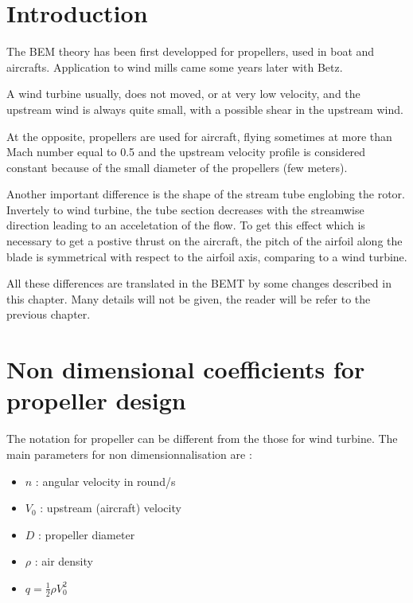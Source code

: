 \section{Introduction}

The BEM theory has been first developped for propellers, used in boat and
aircrafts. Application to wind mills came some years later with Betz.

A wind turbine usually, does not moved, or at very low velocity, and the upstream wind is always
quite small, with a possible shear in the upstream wind.

At the opposite, propellers are used for aircraft, flying sometimes at more than Mach number equal to 0.5
and the upstream velocity profile is considered constant because of the small diameter of the propellers (few meters).

Another important difference is the shape of the stream tube englobing the rotor. Invertely to wind turbine, the 
tube section decreases with the streamwise direction leading to an acceletation of the flow.
To get this effect which is necessary to get a postive thrust on the aircraft, the pitch of the airfoil along
the blade is symmetrical with respect to the airfoil axis, comparing to a wind turbine.

All these differences are translated in the BEMT by some changes described in this chapter. 
Many details will not be given, the reader will be refer to the previous chapter.

\section{Non dimensional coefficients for propeller design}

The notation for propeller can be different from the those for wind turbine.
The main parameters for non dimensionnalisation are :
\begin{itemize}
\item $n$ : angular velocity in round/s
\item $V_0$ : upstream (aircraft) velocity
\item $D$ : propeller diameter
\item $\rho$ : air density
\item $q = \frac{1}{2} \rho V_0^2$
\end{itemize}

